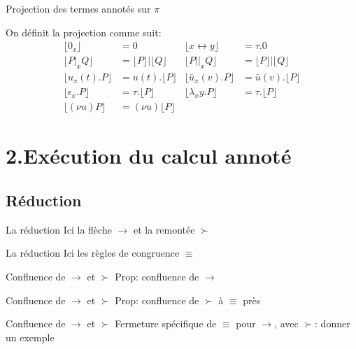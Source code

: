 \documentclass[11pt]{beamer}
\newcommand{\tto}{\leftrightarrow}
\begin{document}
\begin{frame}{Projection des termes annotés sur $\pi$}
\begin{definition}
On définit la projection comme suit:
\begin{align*}
\lfloor 0_x \rfloor &= 0 & \lfloor x\tto y \rfloor &= \tau.0\\
\lfloor P|_xQ \rfloor &= \lfloor P \rfloor|\lfloor Q\rfloor & \lfloor P||_xQ \rfloor &= \lfloor P \rfloor|\lfloor Q\rfloor \\
\lfloor u_x(t).P \rfloor &= u(t).\lfloor P\rfloor & \lfloor \bar{u}_x(v).P \rfloor &= \bar{u}(v).\lfloor P\rfloor\\
\lfloor \epsilon_x.P \rfloor &= \tau.\lfloor P\rfloor & \lfloor \lambda_xy.P \rfloor &= \tau.\lfloor P\rfloor\\
\lfloor(\nu u)P\rfloor &= (\nu u)\lfloor P\rfloor
\end{align*}
\end{definition}
\end{frame}


\section{2.Exécution du calcul annoté}
\subsection{Réduction}

\begin{frame}{La réduction}
Ici la flèche $\to$ et la remontée $\succ$ %
\end{frame}

\begin{frame}{La réduction}
Ici les règles de congruence $\equiv$ %
\end{frame}

\begin{frame}{Confluence de $\to$ et $\succ$}
Prop: confluence de $\to$ %
\end{frame}

\begin{frame}{Confluence de $\to$ et $\succ$}
Prop: confluence de $\succ$ à $\equiv$ près %
\end{frame}

\begin{frame}{Confluence de $\to$ et $\succ$}
Fermeture spécifique de $\equiv$ pour $\to$, avec $\succ$: donner un exemple %
\end{frame}
\end{document}
